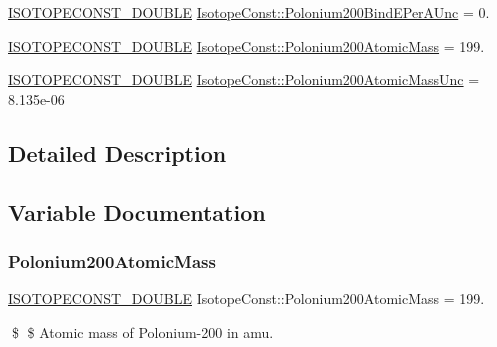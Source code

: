 \begin{DoxyCompactItemize}
\mbox{\hyperlink{group___isotope_const-_macros_ga8f45a7272ce02c0b4c65c44636ed719a}{I\+S\+O\+T\+O\+P\+E\+C\+O\+N\+S\+T\+\_\+\+D\+O\+U\+B\+LE}} \mbox{\hyperlink{group___isotope_const-_polonium-_po200_gae30b30240138a2a2671ae94b7e1dddf7}{Isotope\+Const\+::\+Polonium200\+Bind\+E\+Per\+A\+Unc}} = 0.
\item 
\mbox{\hyperlink{group___isotope_const-_macros_ga8f45a7272ce02c0b4c65c44636ed719a}{I\+S\+O\+T\+O\+P\+E\+C\+O\+N\+S\+T\+\_\+\+D\+O\+U\+B\+LE}} \mbox{\hyperlink{group___isotope_const-_polonium-_po200_gaf32eb43fd59daaa32e10d9bdaa6d9e86}{Isotope\+Const\+::\+Polonium200\+Atomic\+Mass}} = 199.
\item 
\mbox{\hyperlink{group___isotope_const-_macros_ga8f45a7272ce02c0b4c65c44636ed719a}{I\+S\+O\+T\+O\+P\+E\+C\+O\+N\+S\+T\+\_\+\+D\+O\+U\+B\+LE}} \mbox{\hyperlink{group___isotope_const-_polonium-_po200_gadfa93c2a0ce51b9d8a6af97610478aae}{Isotope\+Const\+::\+Polonium200\+Atomic\+Mass\+Unc}} = 8.\+135e-\/06
\end{DoxyCompactItemize}


\subsection{Detailed Description}


\subsection{Variable Documentation}
\mbox{\label{group___isotope_const-_polonium-_po200_gaf32eb43fd59daaa32e10d9bdaa6d9e86}} 
\subsubsection{\texorpdfstring{Polonium200\+Atomic\+Mass}{Polonium200AtomicMass}}
{\footnotesize\ttfamily \mbox{\hyperlink{group___isotope_const-_macros_ga8f45a7272ce02c0b4c65c44636ed719a}{I\+S\+O\+T\+O\+P\+E\+C\+O\+N\+S\+T\+\_\+\+D\+O\+U\+B\+LE}} Isotope\+Const\+::\+Polonium200\+Atomic\+Mass = 199.}

\$ \$ Atomic mass of Polonium-\/200 in amu. \mbox{\label{group___isotope_const-_polonium-_po200_gadfa93c2a0ce51b9d8a6af97610478aae}} 
